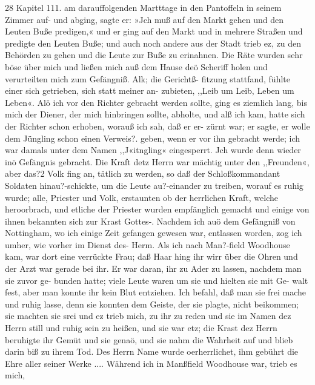 28 Kapitel 111.
am darauffolgenden Martttage in den Pantoffeln in seinem
Zimmer auf- und abging, sagte er: »Jch muß auf den Markt
gehen und den Leuten Buße predigen,« und er ging auf den Markt
und in mehrere Straßen und predigte den Leuten Buße; und auch
noch andere aus der Stadt trieb ez, zu den Behörden zu gehen
und die Leute zur Buße zu erinahnen. Die Räte wurden sehr
böse über mich und ließen mich auß dem Hause deö Scheriff
holen und verurteilten mich zum Gefängniß. Alk; die Gerichtß-
fitzung stattfand, fühlte einer sich getrieben, sich statt meiner an-
zubieten, ,,Leib um Leib, Leben um Leben«. Alö ich vor den
Richter gebracht werden sollte, ging es ziemlich lang, bis mich
der Diener, der mich hinbringen sollte, abholte, und alß ich kam,
hatte sich der Richter schon erhoben, worauß ich sah, daß er er-
zürnt war; er sagte, er wolle dem Jüngling schon einen Verweis?.
geben, wenn er vor ihn gebracht werde; ich war damals unter
dem Namen ,,J«itngling« eingesperrt. Jch wurde denn wieder
inö Gefängnis gebracht. Die Kraft detz Herrn war mächtig
unter den ,,Freunden«, aber das?2 Volk fing an, tätlich zu
werden, so daß der Schloßkommandant Soldaten hinau?-schickte,
um die Leute au?-einander zu treiben, worauf es ruhig wurde;
alle, Priester und Volk, erstaunten ob der herrlichen Kraft, welche
heroorbrach, und etliche der Priester wurden empfänglich gemacht
und einige von ihnen bekannten sich zur Krast Gottes-.
Nachdem ich auö dem Gefängniß von Nottingham, wo ich
einige Zeit gefangen gewesen war, entlassen worden, zog ich
umher, wie vorher im Dienst des- Herm. Als ich nach Man?-field
Woodhouse kam, war dort eine verrückte Frau; daß Haar hing
ihr wirr über die Ohren und der Arzt war gerade bei ihr. Er
war daran, ihr zu Ader zu lassen, nachdem man sie zuvor ge-
bunden hatte; viele Leute waren um sie und hielten sie mit Ge-
walt fest, aber man konnte ihr kein Blut entziehen. Ich befahl,
daß man sie frei mache und ruhig lasse, denn sie konnten dem
Geiste, der sie plagte, nicht beikommen; sie machten sie srei und
ez trieb mich, zu ihr zu reden und sie im Namen dez Herrn still
und ruhig sein zu heißen, und sie war etz; die Krast dez Herrn
beruhigte ihr Gemüt und sie genaö, und sie nahm die Wahrheit
auf und blieb darin biß zu ihrem Tod. Des Herrn Name wurde
oerherrlichet, ihm gebührt die Ehre aller seiner Werke ....
Während ich in Manßfield Woodhouse war, trieb es mich,


